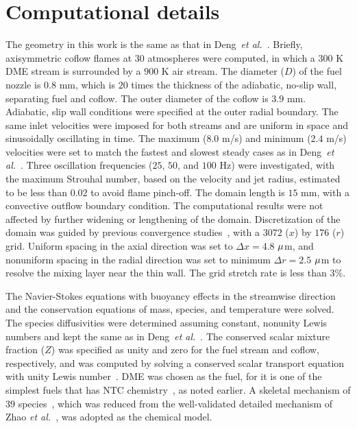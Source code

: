 \documentclass[review,3p,times]{elsarticle}
\begin{document}
 

\section{Computational details} \label{sec:computation}

The geometry in this work is the same as that in Deng~\emph{et al.}~\cite{deng15b}.  Briefly, axisymmetric coflow flames at $30$ atmospheres were computed, in which a $300$ K DME stream is surrounded by a $900$ K air stream.  The diameter ($D$) of the fuel nozzle is $0.8$ mm, which is $20$ times the thickness of the adiabatic, no-slip wall, separating fuel and coflow.  The outer diameter of the coflow is $3.9$ mm.  Adiabatic, slip wall conditions were specified at the outer radial boundary.  The same inlet velocities were imposed for both streams and are uniform in space and sinusoidally oscillating in time.  The maximum ($8.0$ m/s) and minimum ($2.4$ m/s) velocities were set to match the fastest and slowest steady cases as in Deng~\emph{et al.}~\cite{deng15b}.  Three oscillation frequencies ($25$, $50$, and $100$ Hz) were investigated, with the maximum Strouhal number, based on the velocity and jet radius, estimated to be less than $0.02$ to avoid flame pinch-off.  The domain length is $15$ mm, with a convective outflow boundary condition.  The computational results were not affected by further widening or lengthening of the domain.  Discretization of the domain was guided by previous convergence studies~\cite{deng15}, with a $3072$ ($x$) by $176$ ($r$) grid.  Uniform spacing in the axial direction was set to $\Delta x = 4.8$ ${\rm \mu}$m, and nonuniform spacing in the radial direction was set to minimum $\Delta r = 2.5$ ${\rm \mu}$m to resolve the mixing layer near the thin wall.  The grid stretch rate is less than $3$\%.

The Navier-Stokes equations with buoyancy effects in the streamwise direction and the conservation equations of mass, species, and temperature were solved.  The species diffusivities were determined assuming constant, nonunity Lewis numbers and kept the same as in Deng~\emph{et al.}~\cite{deng15}.  The conserved scalar mixture fraction ($Z$) was specified as unity and zero for the fuel stream and coflow, respectively, and was computed by solving a conserved scalar transport equation with unity Lewis number~\cite{pitsch98b}.  DME was chosen as the fuel, for it is one of the simplest fuels that has NTC chemistry~\cite{deng14}, as noted earlier.  A skeletal mechanism of $39$ species~\cite{bhagatwala15}, which was reduced from the well-validated detailed mechanism of Zhao \emph{et al.}~\cite{zhao08}, was adopted as the chemical model.    
\end{document}

